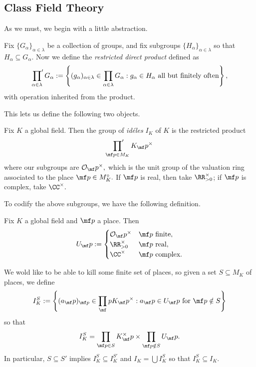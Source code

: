 \subsection{Class Field Theory}
As we must, we begin with a little abstraction.
\begin{definition}
	Fix $\{G_\alpha\}_{\alpha\in\lambda}$ be a collection of groups, and fix subgroups $\{H_\alpha\}_{\alpha\in\lambda}$ so that $H_\alpha\subseteq G_\alpha.$ Now we define the \textit{restricted direct product} defined as
	\[\sideset{}{'}\prod_{\alpha\in\lambda}G_\alpha:=\left\{(g_\alpha)_{\alpha\in\lambda}\in\prod_{\alpha\in\lambda}G_\alpha:g_\alpha\in H_\alpha\text{ all but finitely often}\right\},\]
	with operation inherited from the product.
\end{definition}
This lets us define the following two objects.
\begin{definition}[Id\'eles]
	Fix $K$ a global field. Then the group of \textit{id\'{e{l}es}} $I_K$ of $K$ is the restricted product
	\[\sideset{}{'}\prod_{\mf p\in M_K}K_\mf p^\times\]
	where our subgroups are $\mathcal O_\mf p^\times,$ which is the unit group of the valuation ring associated to the place $\mf p\in M_K^\circ.$ If $\mf p$ is real, then take $\RR^\times_{>0}$; if $\mf p$ is complex, take $\CC^\times.$
\end{definition}
To codify the above subgroups, we have the following definition.
\begin{definition}
	Fix $K$ a global field and $\mf p$ a place. Then
	\[U_\mf p:=\begin{cases}
		\mathcal O_\mf p^\times & \mf p\text{ finite}, \\
		\RR^\times_{>0} & \mf p\text{ real}, \\
		\CC^\times & \mf p\text{ complex}.
	\end{cases}\]
\end{definition}
We wold like to be able to kill some finite set of places, so given a set $S\subseteq M_K$ of places, we define
\[I^S_K:=\left\{(a_\mf p)_{\mf p}\in\prod_\mf p K_\mf p^\times:a_\mf p\in U_\mf p\text{ for }\mf p\notin S\right\}\]
so that
\[I^S_K=\prod_{\mf p\in S}K^\times_\mf p\times\prod_{\mf p\notin S}U_\mf p.\]
In particular, $S\subseteq S'$ implies $I^S_K\subseteq I^{S'}_K$ and $I_K=\bigcup I^S_K$ so that $I^S_K\subseteq I_K.$

